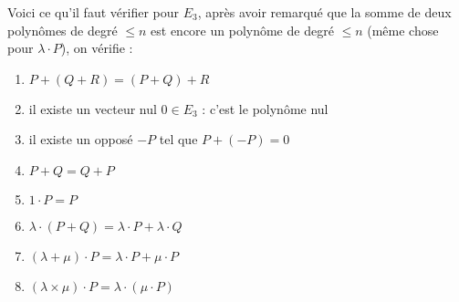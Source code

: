 {{\bigskip

Voici ce qu'il faut vérifier pour $E_3$, après avoir remarqué que la somme de deux polynômes de degré 
$\le n$ est encore un polynôme de degré $\le n$
(même chose pour $\lambda\cdot P$), on vérifie :

\begin{enumerate}
  \item $P+(Q+R)=(P+Q)+R$ 
  \item il existe un vecteur nul $0 \in E_3$ : c'est le polynôme nul
  \item il existe un opposé $-P$ tel que $P+(-P)=0$ 
  \item $P+Q=Q+P$ 
  \item $1\cdot P = P$ 
  \item $\lambda \cdot (P+Q) = \lambda\cdot P + \lambda \cdot Q$ 
  \item $(\lambda+\mu) \cdot P = \lambda\cdot P+ \mu \cdot P$ 
  \item $(\lambda\times\mu) \cdot P = \lambda\cdot (\mu\cdot P)$ 
\end{enumerate}}
}